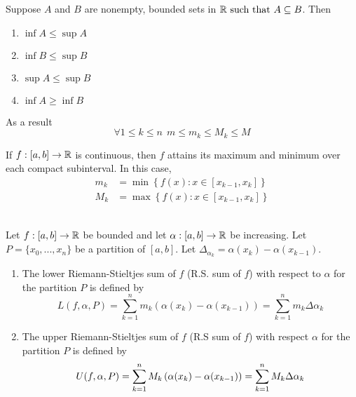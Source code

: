 \begin{remark}
    Suppose $A$ and $B$ are nonempty, bounded sets in $\mathbb{R} \text{ such that } A \subseteq B$. Then 
    \begin{enumerate}[$(i)$]
        \item $\inf A \leq \sup A$
        \item $\inf B \leq \sup B$
        \item $\sup A \leq \sup B$
        \item $\inf A \geq \inf B$
    \end{enumerate}
    As a result
    $$
    \forall 1 \leq k \leq n ~~m \leq m_k \leq M_k \leq M
    $$
\end{remark}

\begin{remark}
    If $f: [a,b] \to \mathbb{R}$ is continuous, then $f$ attains its maximum and minimum over each compact subinterval. In this case,
    \begin{align*}
        m_k &= \min \left\{f(x) : x \in [x_{k-1}, x_k]\right\} \\
        M_k &= \max \left\{f(x) : x \in [x_{k-1}, x_k]\right\}
    \end{align*}
\end{remark}

\begin{definition}\leavevmode\\
    Let $f: [a,b] \to \mathbb{R}$ be bounded and let $\alpha: [a,b] \to \mathbb{R}$ be increasing. Let $P=\{x_0, ..., x_n\}$ be a partition of $[a,b]$. Let $\Delta_{\alpha_k}=\alpha(x_k) - \alpha(x_{k-1})$.
    \begin{enumerate}[$(i)$]
        \item The lower Riemann-Stieltjes sum of $f$ (R.S. sum of $f$) with respect to $\alpha$ for the partition $P$ is defined by
        $$
        L(f, \alpha, P) = \sum_{k=1}^{n}m_k \left(\alpha(x_k)-\alpha(x_{k-1})\right) = \sum_{k=1}^{n}m_k \Delta \alpha_k
        $$
        \item The upper Riemann-Stieltjes sum of $f$ (R.S sum of $f$) with respect $\alpha$ for the partition $P$ is defined by 
        $$
        U(f, \alpha, P) = \sum_{k=1}^{n}M_k \left(\alpha(x_{k})-\alpha(x_{k-1})\right) = \sum_{k=1}^{n}M_k \Delta \alpha_{k}
        $$
    \end{enumerate}
\end{definition}

